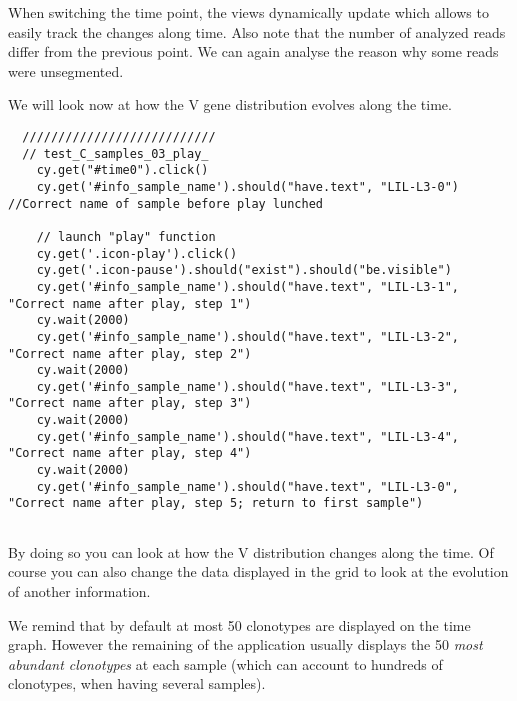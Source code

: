 When switching the time point, the views dynamically update which allows to
easily track the changes along time. Also note that the number of analyzed
reads differ from the previous point. We can again analyse the reason why some
reads were unsegmented.


\bigskip

We will look now at how the V gene distribution evolves along the time.
\begin{verbatim}
  ///////////////////////////
  // test_C_samples_03_play_
    cy.get("#time0").click()
    cy.get('#info_sample_name').should("have.text", "LIL-L3-0") //Correct name of sample before play lunched

    // launch "play" function
    cy.get('.icon-play').click()
    cy.get('.icon-pause').should("exist").should("be.visible")
    cy.get('#info_sample_name').should("have.text", "LIL-L3-1", "Correct name after play, step 1")
    cy.wait(2000)
    cy.get('#info_sample_name').should("have.text", "LIL-L3-2", "Correct name after play, step 2")
    cy.wait(2000)
    cy.get('#info_sample_name').should("have.text", "LIL-L3-3", "Correct name after play, step 3")
    cy.wait(2000)
    cy.get('#info_sample_name').should("have.text", "LIL-L3-4", "Correct name after play, step 4")
    cy.wait(2000)
    cy.get('#info_sample_name').should("have.text", "LIL-L3-0", "Correct name after play, step 5; return to first sample")


\end{verbatim}

By doing so you can look at how the V distribution changes along the time.
Of course you can also change the data displayed in the grid to look at
the evolution of another information.

\bigskip

We remind that by default at most 50 clonotypes are displayed
on the time graph. However the remaining of the application usually displays
the 50 \textit{most abundant clonotypes} at each sample (which can account to hundreds of
clonotypes, when having several samples).

